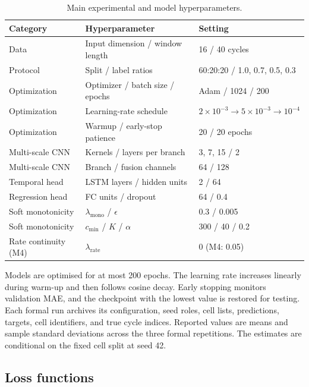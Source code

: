 \documentclass[pdflatex,sn-mathphys-num]{sn-jnl}
\begin{document}
\begin{table}[t]
\caption{Main experimental and model hyperparameters.}
\label{tab:hyperparameters}
\centering
\setlength{\tabcolsep}{5pt}
\renewcommand{\arraystretch}{1.08}
\begin{tabular*}{\textwidth}{@{\extracolsep{\fill}}lll@{}}
\toprule
Category & Hyperparameter & Setting \\
\midrule
Data & Input dimension / window length & 16 / 40 cycles \\
Protocol & Split / label ratios & 60:20:20 / 1.0, 0.7, 0.5, 0.3 \\
Optimization & Optimizer / batch size / epochs & Adam / 1024 / 200 \\
Optimization & Learning-rate schedule & $2\times10^{-3}\rightarrow5\times10^{-3}\rightarrow10^{-4}$ \\
Optimization & Warmup / early-stop patience & 20 / 20 epochs \\
Multi-scale CNN & Kernels / layers per branch & 3, 7, 15 / 2 \\
Multi-scale CNN & Branch / fusion channels & 64 / 128 \\
Temporal head & LSTM layers / hidden units & 2 / 64 \\
Regression head & FC units / dropout & 64 / 0.4 \\
Soft monotonicity & $\lambda_{\mathrm{mono}}$ / $\epsilon$ & 0.3 / 0.005 \\
Soft monotonicity & $c_{\min}$ / $K$ / $\alpha$ & 300 / 40 / 0.2 \\
Rate continuity (M4) & $\lambda_{\mathrm{rate}}$ & 0 (M4: 0.05) \\
\bottomrule
\end{tabular*}
\end{table}

Models are optimised for at most 200 epochs. The learning rate increases linearly during warm-up and then follows cosine decay. Early stopping monitors validation MAE, and the checkpoint with the lowest value is restored for testing. Each formal run archives its configuration, seed roles, cell lists, predictions, targets, cell identifiers, and true cycle indices. Reported values are means and sample standard deviations across the three formal repetitions. The estimates are conditional on the fixed cell split at seed 42.

\subsection{Loss functions}
\label{subsec:loss_functions}
\end{document}
